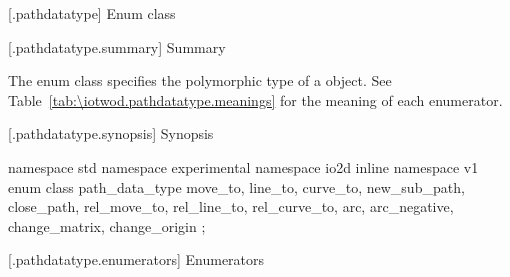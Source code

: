  [\iotwod.pathdatatype] {Enum class }

 [\iotwod.pathdatatype.summary] { Summary}

\pnum
The  enum class specifies the polymorphic type of a 
 object.
See Table~\ref{tab:\iotwod.pathdatatype.meanings} for the meaning of each
 enumerator.

 [\iotwod.pathdatatype.synopsis] { Synopsis}

\begin{codeblock}
namespace std { namespace experimental { namespace io2d { inline namespace v1 {
  enum class path_data_type {
    move_to,
    line_to,
    curve_to,
    new_sub_path,
    close_path,
    rel_move_to,
    rel_line_to,
    rel_curve_to,
    arc,
    arc_negative,
    change_matrix,
    change_origin
  };
} } } }
\end{codeblock}

 [\iotwod.pathdatatype.enumerators] { Enumerators}

